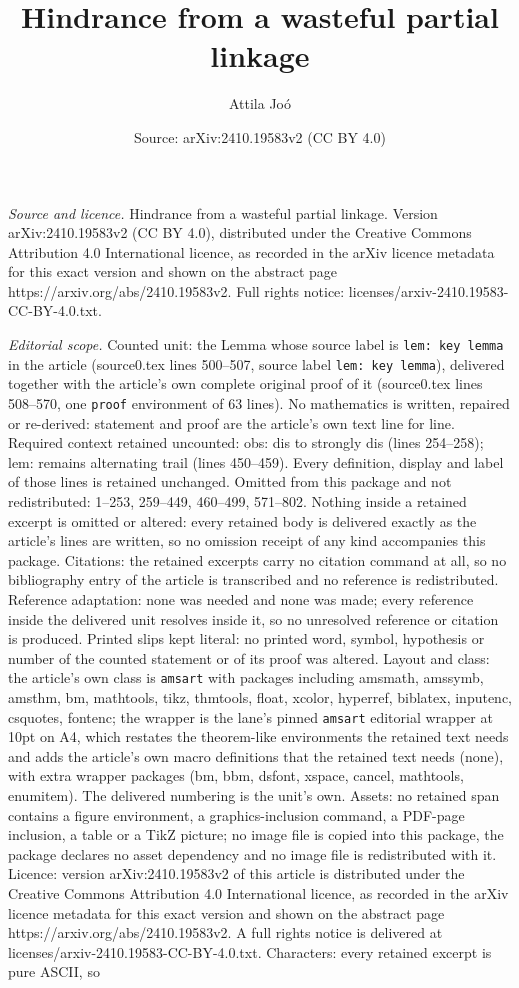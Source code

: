 \documentclass[10pt,a4paper]{amsart}
\title[Hindrance from a wasteful partial linkage]{Hindrance from a wasteful partial linkage}
\author{Attila Jo\'o}
\date{Source: arXiv:2410.19583v2 (CC BY 4.0)}
\begin{document}
\maketitle

\noindent\emph{Source and licence.} Hindrance from a wasteful partial linkage. Version arXiv:2410.19583v2 (CC BY 4.0), distributed under the Creative Commons Attribution 4.0 International licence, as recorded in the arXiv licence metadata for this exact version and shown on the abstract page https://arxiv.org/abs/2410.19583v2. Full rights notice: licenses/arxiv-2410.19583-CC-BY-4.0.txt.\par\smallskip

\noindent\textit{Editorial scope.} Counted unit: the Lemma whose source label is \texttt{lem: key lemma} in the article (source0.tex lines 500--507, source label \texttt{lem: key lemma}), delivered together with the article's own complete original proof of it (source0.tex lines 508--570, one \texttt{proof} environment of 63 lines). No mathematics is written, repaired or re-derived: statement and proof are the article's own text line for line. Required context retained uncounted: obs: dis to strongly dis (lines 254--258); lem: remains alternating trail (lines 450--459). Every definition, display and label of those lines is retained unchanged. Omitted from this package and not redistributed: 1--253, 259--449, 460--499, 571--802. Nothing inside a retained excerpt is omitted or altered: every retained body is delivered exactly as the article's lines are written, so no omission receipt of any kind accompanies this package. Citations: the retained excerpts carry no citation command at all, so no bibliography entry of the article is transcribed and no reference is redistributed. Reference adaptation: none was needed and none was made; every reference inside the delivered unit resolves inside it, so no unresolved reference or citation is produced. Printed slips kept literal: no printed word, symbol, hypothesis or number of the counted statement or of its proof was altered. Layout and class: the article's own class is \texttt{amsart} with packages including amsmath, amssymb, amsthm, bm, mathtools, tikz, thmtools, float, xcolor, hyperref, biblatex, inputenc, csquotes, fontenc; the wrapper is the lane's pinned \texttt{amsart} editorial wrapper at 10pt on A4, which restates the theorem-like environments the retained text needs and adds the article's own macro definitions that the retained text needs (none), with extra wrapper packages (bm, bbm, dsfont, xspace, cancel, mathtools, enumitem). The delivered numbering is the unit's own. Assets: no retained span contains a figure environment, a graphics-inclusion command, a PDF-page inclusion, a table or a TikZ picture; no image file is copied into this package, the package declares no asset dependency and no image file is redistributed with it. Licence: version arXiv:2410.19583v2 of this article is distributed under the Creative Commons Attribution 4.0 International licence, as recorded in the arXiv licence metadata for this exact version and shown on the abstract page https://arxiv.org/abs/2410.19583v2. A full rights notice is delivered at licenses/arxiv-2410.19583-CC-BY-4.0.txt. Characters: every retained excerpt is pure ASCII, so 
\end{document}
